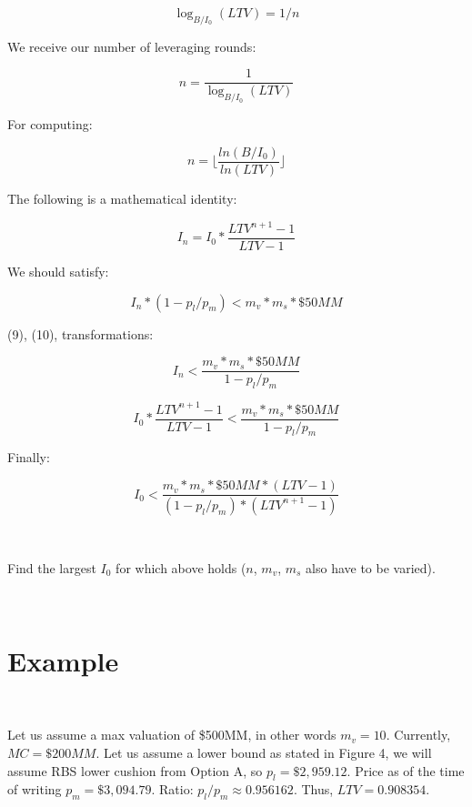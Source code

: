 \documentclass{article}
\begin{document}
\begin{equation}
    \log_{B/I_0}(LTV) = 1 / n
\end{equation}

We receive our number of leveraging rounds:

\begin{equation}
    n = \frac{1}{\log_{B/I_0}(LTV)}
\end{equation}

For computing:

\begin{equation}
    n = \lfloor\frac{ln(B/I_0)}{ln(LTV)}\rfloor
\end{equation}

The following is a mathematical identity:

\begin{equation}
    I_n = I_0 * \frac{LTV^{n+1} - 1}{LTV - 1}
\end{equation}

\newpage

We should satisfy:

\begin{equation}
    I_n * (1 - p_l / p_m) < m_v * m_s * \$50MM
\end{equation}

(9), (10), transformations:

\begin{equation}
    I_n  < \frac{m_v * m_s * \$50MM}{1 - p_l / p_m}
\end{equation}

\begin{equation}
    I_0 * \frac{LTV^{n+1} - 1}{LTV - 1}  < \frac{m_v * m_s * \$50MM}{1 - p_l / p_m}
\end{equation}

Finally:

\begin{equation}
    I_0 <  \frac{m_v * m_s * \$50MM * (LTV - 1)}{(1 - p_l / p_m)*(LTV^{n+1} - 1)}
\end{equation}

\

Find the largest $I_0$ for which above holds ($n$, $m_v$, $m_s$ also have to be varied).

\

\section{Example}

\

Let us assume a max valuation of \$500MM, in other words $m_v = 10.$ Currently, $MC = \$200MM$. Let us assume a lower bound as stated in Figure 4, we will assume RBS lower cushion from Option A, so $p_l = \$2,959.12$. Price as of the time of writing $p_m = \$3,094.79$. Ratio: $p_l / p_m \approx 0.956162$. Thus, $LTV = 0.908354$.
\end{document}
